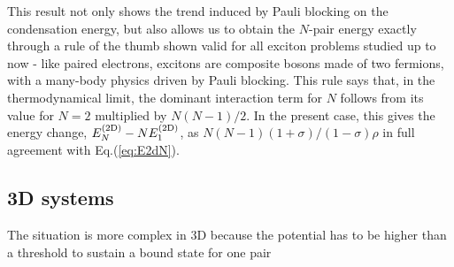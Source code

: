 \documentclass[5p,twocolumn]{elsarticle}
\begin{document}
This result not only shows the trend induced by Pauli blocking on the condensation energy, but also allows us to obtain the $N$-pair energy exactly through a rule of the thumb shown valid for all exciton problems studied up to now - like paired electrons, excitons are composite bosons made of two fermions, with a many-body physics driven by Pauli blocking.  This rule says that, in the thermodynamical limit, the dominant interaction term for $N$ follows from its value for $N= 2$ multiplied by $N(N-1)/2$.  In the present case, this gives the energy change, $E^{{{\text{(2D)}}}}_N-NE^{{{\text{(2D)}}}}_1$, as $N(N-1)(1+\sigma)/(1-\sigma)\rho$ in full agreement with
Eq.(\ref{eq:E2dN}).


\subsection{3D systems}

The situation is more complex in 3D because the potential has to be higher than a threshold to sustain a bound state for one pair
\end{document}
